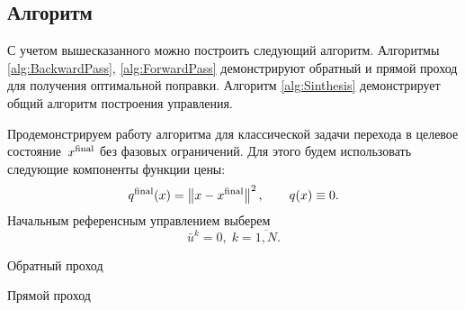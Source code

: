 \documentclass[../../doc.tex]{subfiles}
\begin{document}
    \subsection{Алгоритм}
    С учетом вышесказанного можно построить следующий алгоритм.
    Алгоритмы \ref{alg:BackwardPass}, \ref{alg:ForwardPass} демонстрируют обратный и прямой проход для получения оптимальной поправки.
    Алгоритм \ref{alg:Sinthesis} демонстрирует общий алгоритм построения управления.

    Продемонстрируем работу алгоритма для классической задачи перехода в целевое состояние~$x^{\textnormal{final}}$ без фазовых ограничений.
    Для этого будем использовать следующие компоненты функции цены:
    \begin{equation}\label{eq:ilqr-algo:cost}
        q^{\textnormal{final}}(x) = \left\|x - x^{\textnormal{final}}\right\|^2,
        \qquad
        q(x) \equiv 0.
    \end{equation}
    Начальным референсным управлением выберем
    \begin{equation}\label{eq:ilqr-algo:ref-control}
        \bar u^k = 0,\; k = \overline{1, N}.
    \end{equation}
    \clearpage
    \begin{rusalgorithm}\caption{Обратный проход}\label{alg:BackwardPass}
        \DontPrintSemicolon
    \end{rusalgorithm}
    \begin{rusalgorithm}\caption{Прямой проход}\label{alg:ForwardPass}
        \DontPrintSemicolon
    \end{rusalgorithm}
    
\end{document}

